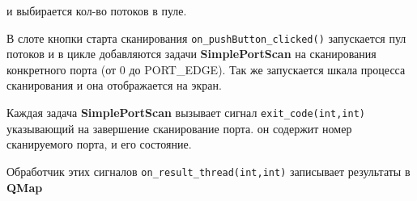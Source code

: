 и выбирается кол-во потоков в пуле.

\begin{Shaded}
\begin{Highlighting}[]
    \NormalTok{);}
\end{Highlighting}
\end{Shaded}

В слоте кнопки старта сканирования \texttt{on\_pushButton\_clicked()}
запускается пул потоков и в цикле добавляются задачи
\textbf{SimplePortScan} на сканирования конкретного порта (от 0 до
PORT\_EDGE). Так же запускается шкала процесса сканирования и она
отображается на экран.

Каждая задача \textbf{SimplePortScan} вызывает сигнал
\texttt{exit\_code(int,int)} указывающий на завершение сканирование
порта. он содержит номер сканируемого порта, и его состояние.

Обработчик этих сигналов \texttt{on\_result\_thread(int,int)} записывает
результаты в \textbf{QMap}
